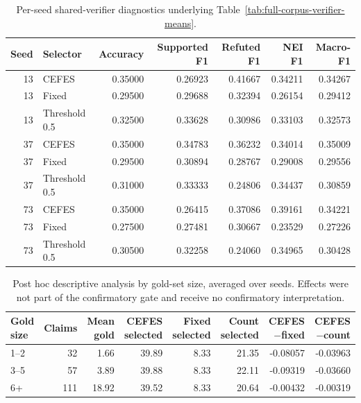 \begin{table}[!t]
\centering
\caption{Per-seed shared-verifier diagnostics underlying Table~\ref{tab:full-corpus-verifier-means}.}
\label{tab:full-corpus-verifier-detail}
\small
\setlength{\tabcolsep}{7pt}
\begin{tabular}{@{}rlrrrrr@{}}
\toprule
Seed & Selector & Accuracy & Supported F1 & Refuted F1 & NEI F1 & Macro-F1 \\
\midrule
13 & CEFES & 0.35000 & 0.26923 & 0.41667 & 0.34211 & 0.34267 \\
13 & Fixed & 0.29500 & 0.29688 & 0.32394 & 0.26154 & 0.29412 \\
13 & Threshold 0.5 & 0.32500 & 0.33628 & 0.30986 & 0.33103 & 0.32573 \\
37 & CEFES & 0.35000 & 0.34783 & 0.36232 & 0.34014 & 0.35009 \\
37 & Fixed & 0.29500 & 0.30894 & 0.28767 & 0.29008 & 0.29556 \\
37 & Threshold 0.5 & 0.31000 & 0.33333 & 0.24806 & 0.34437 & 0.30859 \\
73 & CEFES & 0.35000 & 0.26415 & 0.37086 & 0.39161 & 0.34221 \\
73 & Fixed & 0.27500 & 0.27481 & 0.30667 & 0.23529 & 0.27226 \\
73 & Threshold 0.5 & 0.30500 & 0.32258 & 0.24060 & 0.34965 & 0.30428 \\
\bottomrule
\end{tabular}
\end{table}

\begin{table}[!t]
\centering
\caption{Post hoc descriptive analysis by gold-set size, averaged over seeds. Effects were not part of the confirmatory gate and receive no confirmatory interpretation.}
\label{tab:gold-size-diagnostics}
\small
\setlength{\tabcolsep}{6pt}
\begin{tabular}{@{}lrrrrrrr@{}}
\toprule
Gold size & Claims & Mean gold & CEFES selected & Fixed selected & Count selected & CEFES$-$fixed & CEFES$-$count \\
\midrule
1--2 & 32 & 1.66 & 39.89 & 8.33 & 21.35 & -0.08057 & -0.03963 \\
3--5 & 57 & 3.89 & 39.88 & 8.33 & 22.11 & -0.09319 & -0.03660 \\
6+ & 111 & 18.92 & 39.52 & 8.33 & 20.64 & -0.00432 & -0.00319 \\
\bottomrule
\end{tabular}
\end{table}
